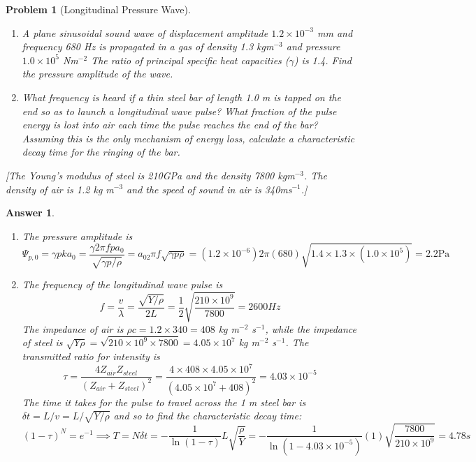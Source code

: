 \documentclass[a4paper]{article}
\newtheorem{ans}{Answer}[section]
\theoremstyle{new}
\newtheorem{qns}{Problem}[section]
\begin{document}
\newpage
\begin{qns}[Longitudinal Pressure Wave]\leavevmode
\begin{enumerate}[label=(\alph*)]
\item A plane sinusoidal sound wave of displacement amplitude $1.2\times10^{-3}$ mm and frequency 680 Hz is propagated in a gas of density 1.3 kgm$^{-3}$ and pressure $1.0\times10^5$ Nm$^{-2}$ The ratio of principal specific heat capacities ($\gamma$) is 1.4. Find the pressure amplitude of the wave.
\item What frequency is heard if a thin steel bar of length 1.0 m is tapped on the end so as to launch a longitudinal wave pulse? What fraction of the pulse energy is lost into air each time the pulse reaches the end of the bar? Assuming this is the only mechanism of energy loss, calculate a characteristic decay time for the ringing of the bar.
\end{enumerate}
[The Young’s modulus of steel is 210GPa
and the density 7800 kgm$^{-3}$. The density of air is 1.2 kg m$^{-3}$ and the speed of sound in air is 340ms$^{-1}$.]
\end{qns}
\begin{ans}\leavevmode
\begin{enumerate}[label=(\alph*)]
\item The pressure amplitude is $$\Psi_{p,0}=\gamma pka_0=\frac{\gamma 2\pi fpa_0}{\sqrt{\gamma p/\rho}}=a_02\pi f\sqrt{\gamma p\rho}=(1.2\times10^{-6})2\pi(680)\sqrt{1.4\times 1.3\times(1.0\times10^5)}=2.2\text{Pa}$$
\item The frequency of the longitudinal wave pulse is
$$f=\frac{v}{\lambda}=\frac{\sqrt{Y/\rho}}{2L}=\frac{1}{2}\sqrt{\frac{210\times10^9}{7800}}=2600 Hz$$
The impedance of air is $\rho c=1.2\times 340=408$ kg m$^{-2}$ s$^{-1}$, while the impedance of steel is $\sqrt{Y\rho}=\sqrt{210\times10^9\times 7800}=4.05\times10^7$ kg m$^{-2}$ s$^{-1}$. The transmitted ratio for intensity is
$$\tau=\frac{4Z_{air}Z_{steel}}{(Z_{air}+Z_{steel})^2}=\frac{4\times 408\times 4.05\times10^7}{(4.05\times10^7+408)^2}=4.03\times10^{-5}$$
The time it takes for the pulse to travel across the 1 m steel bar is $\delta t=L/v=L/\sqrt{Y/\rho}$ and so to find the characteristic decay time:
$$(1-\tau)^N=e^{-1}\implies T=N\delta t=-\frac{1}{\ln(1-\tau)}L\sqrt{\frac{\rho}{Y}}=-\frac{1}{\ln(1-4.03\times10^{-5})}(1)\sqrt{\frac{7800}{210\times10^9}}=4.78s$$
\end{enumerate}
\end{ans}
\newpage
\end{document}
